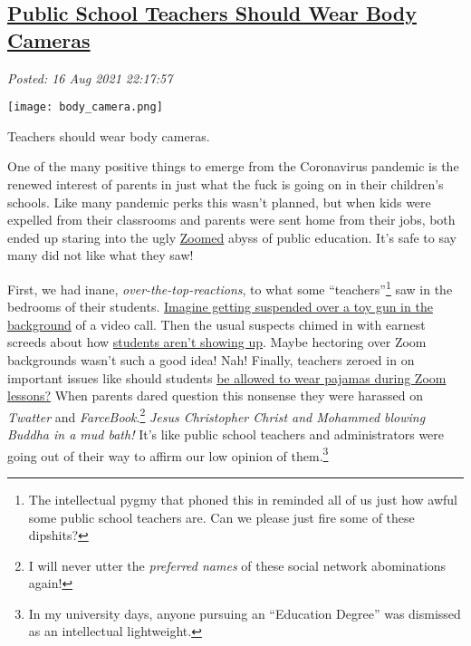 %

\subsection*{\href{http://analyzethedatanotthedrivel.org/2021/08/16/public-school-teachers-should-wear-body-cameras/}{Public School Teachers Should Wear Body Cameras}}


\noindent\emph{Posted: 16 Aug 2021 22:17:57}
\vspace{6pt}


 \captionsetup[floatingfigure]{labelformat=empty}
 \begin{floatingfigure}[l]{0.25\textwidth}
 \centering
 \texttt{[image: body\_camera.png]}
 \caption{Teachers should wear body cameras.}
 \label{fig:7202x0}
 \end{floatingfigure} One of the many positive things to emerge from the Coronavirus pandemic
is the renewed interest of parents in just what the fuck is going on in
their children's schools. Like many pandemic perks this wasn't planned,
but when kids were expelled from their classrooms and parents were sent
home from their jobs, both ended up staring into the ugly
\href{https://zoom.us/}{Zoomed} abyss of public education. It's safe to
say many did not like what they saw!

First, we had inane, \emph{over-the-top-reactions}, to what some
``teachers''\footnote{The intellectual pygmy that phoned this in reminded all of us just how
  awful some public school teachers are. Can we please just fire some of
  these dipshits?
} saw in the
bedrooms of their students.
\href{https://www.cnn.com/2020/09/26/us/student-suspended-gun-virtual/index.html}{Imagine
getting suspended over a toy gun in the background} of a video call.
Then the usual suspects chimed in with earnest screeds about how
\href{https://www.the74million.org/article/how-missing-zoom-classes-could-funnel-kids-into-the-juvenile-justice-system-and-why-some-experts-say-now-is-the-time-to-reform-truancy-rules/}{students
aren't showing up}. Maybe hectoring over Zoom backgrounds wasn't such a
good idea! Nah! Finally, teachers zeroed in on important issues like
should students
\href{https://www.smartclassroommanagement.com/2020/08/22/students-pajamas-zoom-lessons/}{be
allowed to wear pajamas during Zoom lessons?} When parents dared
question this nonsense they were harassed on \emph{Twatter} and
\emph{FarceBook}.\footnote{I will never utter the \emph{preferred names} of these social network
  abominations again!} \emph{Jesus Christopher Christ and Mohammed blowing Buddha in a mud
bath!} It's like public school teachers and administrators were going
out of their way to affirm our low opinion of
them.\footnote{In my university days, anyone pursuing an ``Education Degree'' was
dismissed as an intellectual
lightweight.} %

